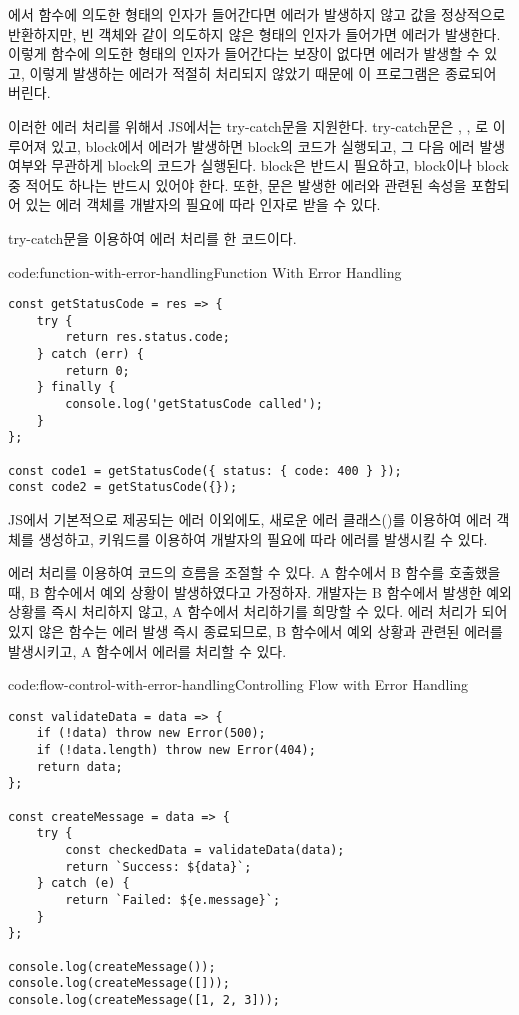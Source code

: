 에서  함수에 의도한 형태의 인자가 들어간다면 에러가 발생하지 않고 값을 정상적으로 반환하지만, 빈 객체와 같이 의도하지 않은 형태의 인자가 들어가면 에러가 발생한다. 이렇게 함수에 의도한 형태의 인자가 들어간다는 보장이 없다면 에러가 발생할 수 있고, 이렇게 발생하는 에러가 적절히 처리되지 않았기 때문에 이 프로그램은 종료되어 버린다.

이러한 에러 처리를 위해서 JS에서는 try-catch문을 지원한다. try-catch문은 , , 로 이루어져 있고,  block에서 에러가 발생하면  block의 코드가 실행되고, 그 다음 에러 발생 여부와 무관하게  block의 코드가 실행된다.  block은 반드시 필요하고,  block이나  block 중 적어도 하나는 반드시 있어야 한다. 또한,  문은 발생한 에러와 관련된 속성을 포함되어 있는 에러 객체를 개발자의 필요에 따라 인자로 받을 수 있다.

\은 try-catch문을 이용하여 에러 처리를 한 코드이다.

\begin{codeenv}{code:function-with-error-handling}{Function With Error Handling}\begin{verbatim}
const getStatusCode = res => {
    try {
        return res.status.code;
    } catch (err) {
        return 0;
    } finally {
        console.log('getStatusCode called');
    }
};

const code1 = getStatusCode({ status: { code: 400 } });
const code2 = getStatusCode({});
\end{verbatim}
\end{codeenv}

JS에서 기본적으로 제공되는 에러 이외에도, 새로운 에러 클래스()를 이용하여 에러 객체를 생성하고,  키워드를 이용하여 개발자의 필요에 따라 에러를 발생시킬 수 있다.

에러 처리를 이용하여 코드의 흐름을 조절할 수 있다. A 함수에서 B 함수를 호출했을 때, B 함수에서 예외 상황이 발생하였다고 가정하자. 개발자는 B 함수에서 발생한 예외 상황를 즉시 처리하지 않고, A 함수에서 처리하기를 희망할 수 있다. 에러 처리가 되어있지 않은 함수는 에러 발생 즉시 종료되므로, B 함수에서 예외 상황과 관련된 에러를 발생시키고, A 함수에서 에러를 처리할 수 있다.

\begin{codeenv}{code:flow-control-with-error-handling}{Controlling Flow with Error Handling}\begin{verbatim}
const validateData = data => {
    if (!data) throw new Error(500);
    if (!data.length) throw new Error(404);
    return data;
};

const createMessage = data => {
    try {
        const checkedData = validateData(data);
        return `Success: ${data}`;
    } catch (e) {
        return `Failed: ${e.message}`;
    }
};

console.log(createMessage());
console.log(createMessage([]));
console.log(createMessage([1, 2, 3]));
\end{verbatim}
\end{codeenv}

